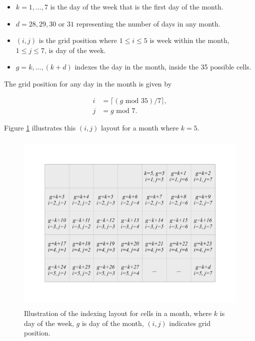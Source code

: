 \documentclass[12pt]{article}
\providecommand{\tightlist}{%
  \setlength{\itemsep}{0pt}\setlength{\parskip}{0pt}}
\begin{document}
\begin{itemize}
\tightlist
\item
  \(k = 1, \dots , 7\) is the day of the week that is the first day of
  the month.
\item
  \(d = 28, 29, 30\) or \(31\) representing the number of days in any
  month.
\item
  \((i, j)\) is the grid position where \(1 \le i \le 5\) is week within
  the month, \(1 \le j \le 7\), is day of the week.
\item
  \(g = k, \dots,(k+d)\) indexes the day in the month, inside the 35
  possible cells.
\end{itemize}

The grid position for any day in the month is given by

\begin{equation}
  \begin{aligned}
  i &= \lceil (g \text{ mod } 35) / 7\rceil, \\
  j &= g \text{ mod } 7. \label{eq:grid}
  \end{aligned}
\end{equation}

Figure \ref{fig:month-diagram} illustrates this \((i,j)\) layout for a
month where \(k=5\).

\begin{figure}

{\centering \includegraphics[width=360pt,height=250pt]{img/month} 

}

\caption{Illustration of the indexing layout for cells in a month, where $k$ is day of the week, $g$ is day of the month, $(i, j)$ indicates grid position.}\label{fig:month-diagram}
\end{figure}
\end{document}

